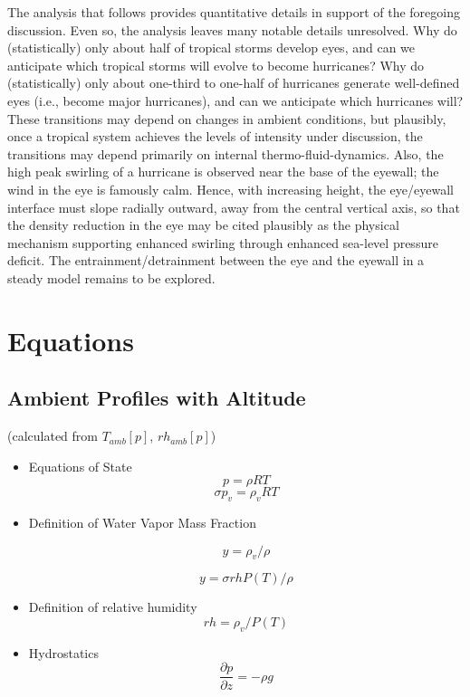 \documentclass{article}
\begin{document}
The analysis that follows provides quantitative details in support of the foregoing discussion. Even so, the analysis leaves many notable details unresolved. Why do (statistically) only about half of tropical storms develop eyes, and can we anticipate which tropical storms will evolve to become hurricanes? Why do (statistically) only about one-third to one-half of hurricanes generate well-defined eyes (i.e., become major hurricanes), and can we anticipate which hurricanes will? These transitions may depend on changes in ambient conditions, but plausibly, once a tropical system achieves the levels of intensity under discussion, the transitions may depend primarily on internal thermo-fluid-dynamics. Also, the high peak swirling of a hurricane is observed near the base of the eyewall; the wind in the eye is famously calm. Hence, with increasing height, the eye/eyewall interface must slope radially outward, away from the central vertical axis, so that the density reduction in the eye may be cited plausibly as the physical mechanism supporting enhanced swirling through enhanced sea-level pressure deficit. The entrainment/detrainment between the eye and the eyewall in a steady model remains to be explored.

\section{Equations}

\subsection{Ambient Profiles with Altitude  }
(calculated from $T_{amb}[p]$, $ rh_{amb}[p]$)
\begin{itemize}

\item Equations of State
\begin{equation}
	p = \rho R T
\end{equation}
\begin{equation}
	\sigma p_v = \rho_v R T
\end{equation}

\item Definition of Water Vapor Mass Fraction

\begin{equation}
	y = \rho_v / \rho
\end{equation}

\begin{equation}
	y = \sigma rh P(T) / \rho
\end{equation}

\item Definition of relative humidity
\begin{equation}
	rh = \rho_v / P(T)
\end{equation}

\item Hydrostatics
\begin{equation}
	\frac{\partial p}{\partial z} = -\rho g
\end{equation}

\end{itemize}
\end{document}
